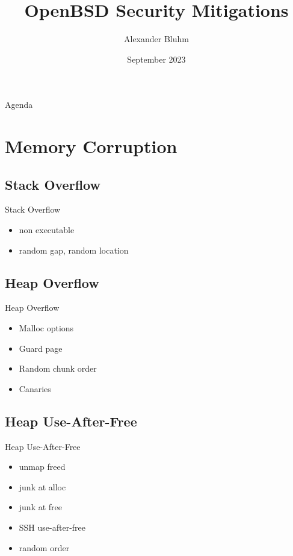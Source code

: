 \documentclass[14pt,aspectratio=169]{beamer}
\author{Alexander Bluhm}
\title{OpenBSD Security Mitigations}
\institute{genua GmbH\\ \url{bluhm@genua.de}\\ \url{bluhm@openbsd.org}}
\date{September 2023}
\begin{document}
\begin{frame}
\titlepage
\end{frame}

\begin{frame}{Agenda}
\setcounter{tocdepth}{1}
\tableofcontents
\end{frame}

\section{Memory Corruption}

\subsection{Stack Overflow}
\begin{frame}{Stack Overflow}
\begin{itemize}
  \item non executable
  \item random gap, random location
\end{itemize}
\end{frame}

\subsection{Heap Overflow}
\begin{frame}{Heap Overflow}
\begin{itemize}
  \item Malloc options
  \item Guard page
  \item Random chunk order
  \item Canaries
\end{itemize}
\end{frame}

\subsection{Heap Use-After-Free}
\begin{frame}{Heap Use-After-Free}
\begin{itemize}
  \item unmap freed
  \item junk at alloc
  \item junk at free
  \item SSH use-after-free
  \item random order
\end{itemize}
\end{frame}
\end{document}
